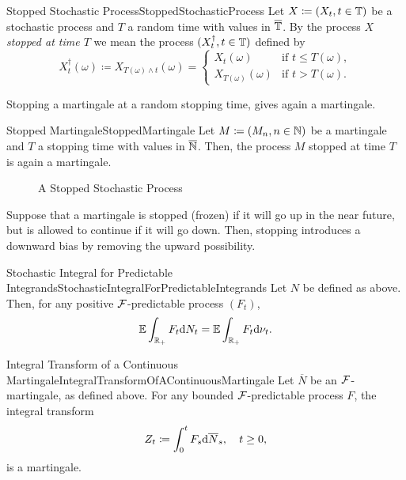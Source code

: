 \begin{defn}{Stopped Stochastic Process}{StoppedStochasticProcess}
	Let $X \coloneqq (X_t, t \in \mathbb{T})$ be a stochastic process and $T$ a random time with values in $\overline{\mathbb{T}}$. By the process $X$ \emph{stopped at time $T$} we mean the process $(X^\dagger_t, t \in \mathbb{T})$ defined by
	\begin{equation}\label{eq:StoppedProcessDefinition}
		X^\dagger_t(\omega) \coloneqq X_{T(\omega) \land t}(\omega) =
		\begin{cases}
			X_t(\omega)           & \text{if } t \le T(\omega), \\
			X_{T(\omega)}(\omega) & \text{if } t > T(\omega).
		\end{cases}
	\end{equation}
\end{defn}

Stopping a martingale at a random stopping time, gives again a martingale.

\begin{thm}{Stopped Martingale}{StoppedMartingale}
	Let $M \coloneqq (M_n, n \in \mathbb{N})$ be a martingale and $T$ a stopping time with values in $\overline{\mathbb{N}}$. Then, the process $M$ stopped at time $T$ is again a martingale.
\end{thm}

\begin{figure}[H]
	\centering
	
	\caption{A Stopped Stochastic Process}
	\label{fig:StoppedStochasticProcess}
\end{figure}

Suppose that a martingale is stopped (frozen) if it will go up in the near future, but is allowed to continue if it will go down. Then, stopping introduces a downward bias by removing the upward possibility.

\begin{prop}{Stochastic Integral for Predictable Integrands}{StochasticIntegralForPredictableIntegrands}
	Let $N$ be defined as above. Then, for any positive $\mathcal{F}$-predictable process $(F_t)$,
	\begin{equation}\label{eq:StochasticIntegralExpectation}
		\mathbb{E} \int_{\mathbb{R}_+} F_t \mathrm{d} N_t = \mathbb{E} \int_{\mathbb{R}_+} F_t \mathrm{d} \nu_t.
	\end{equation}
\end{prop}

\begin{thm}{Integral Transform of a Continuous Martingale}{IntegralTransformOfAContinuousMartingale}
	Let $\overline{N}$ be an $\mathcal{F}$-martingale, as defined above. For any bounded $\mathcal{F}$-predictable process $F$, the integral transform
	\begin{equation}\label{eq:ContinuousMartingaleTransform}
		Z_t \coloneqq \int_0^t F_s \mathrm{d} \overline{N}_s, \quad t \ge 0,
	\end{equation}
	is a martingale.
\end{thm}

